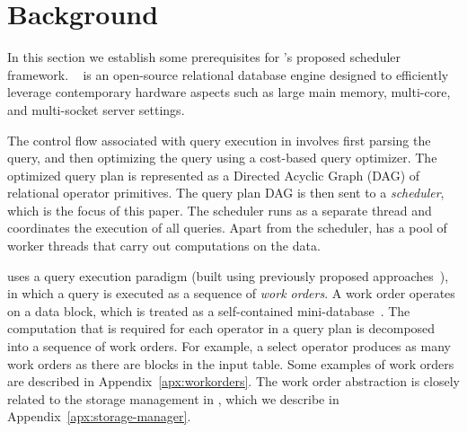 \section{Background}\label{sec:background}
In this section we establish some prerequisites for \sys{}'s proposed scheduler framework.
\sys{}~\cite{quickstep} is an open-source relational database engine 
designed to efficiently leverage contemporary hardware aspects such as large main memory, multi-core, and multi-socket server settings. 

The control flow associated with query execution in \sys{} involves first parsing the query, and then optimizing the query using a cost-based query optimizer.
The optimized query plan is represented as a Directed Acyclic Graph (DAG) of relational operator primitives. 
The query plan DAG is then sent to a \textit{scheduler}, which is the focus of this paper. 
The scheduler runs as a separate thread and coordinates the execution of all queries. 
Apart from the scheduler, \sys{} has a pool of worker threads that carry out computations on the data. 

\sys{} uses a query execution paradigm (built using previously proposed approaches~\cite{qsstorage,morsel}), in which a query is executed as a sequence of \textit{work orders}. 
A work order operates on a data block, which is treated as a self-contained mini-database~\cite{qsstorage}. 
The computation that is required for each operator in a query plan is decomposed into a sequence of work orders. 
For example, a select operator produces as many work orders as there are blocks in the input table. 
Some examples of work orders are described in Appendix~\ref{apx:workorders}.
The work order abstraction is closely related to the storage management in \sys{}, which we describe in Appendix~\ref{apx:storage-manager}.